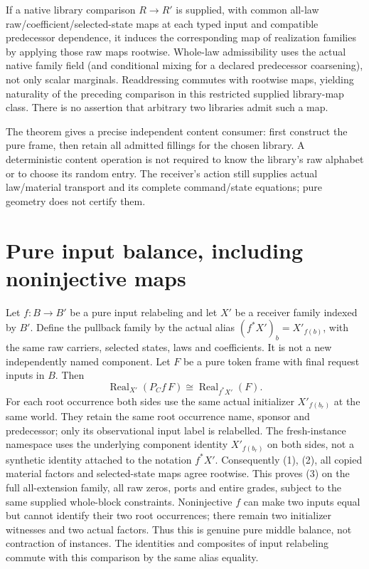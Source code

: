 \documentclass[11pt]{article}
\begin{document}
If a native library comparison $R\to R'$ is supplied, with common all-law raw/coefficient/selected-state maps at each typed input and compatible predecessor dependence, it induces the corresponding map of realization families by applying those raw maps rootwise. Whole-law admissibility uses the actual native family field (and conditional mixing for a declared predecessor coarsening), not only scalar marginals. Readdressing commutes with rootwise maps, yielding naturality of the preceding comparison in this restricted supplied library-map class. There is no assertion that arbitrary two libraries admit such a map.

The theorem gives a precise independent content consumer: first construct the pure frame, then retain all admitted fillings for the chosen library. A deterministic content operation is not required to know the library's raw alphabet or to choose its random entry. The receiver's action still supplies actual law/material transport and its complete command/state equations; pure geometry does not certify them.


\section{Pure input balance, including noninjective maps}
Let $f:B\to B'$ be a pure input relabeling and let $X'$ be a receiver family indexed by $B'$. Define the pullback family by the actual alias $(f^*X')_b=X'_{f(b)}$, with the same raw carriers, selected states, laws and coefficients. It is not a new independently named component. Let $F$ be a pure token frame with final request inputs in $B$. Then
\[
 \operatorname{Real}_{X'}(P_Cf\,F)
       \cong \operatorname{Real}_{f^*X'}(F).             \tag{3}
\]
For each root occurrence both sides use the same actual initializer $X'_{f(b_r)}$ at the same world. They retain the same root occurrence name, sponsor and predecessor; only its observational input label is relabelled. The fresh-instance namespace uses the underlying component identity $X'_{f(b_r)}$ on both sides, not a synthetic identity attached to the notation $f^*X'$. Consequently (1), (2), all copied material factors and selected-state maps agree rootwise. This proves (3) on the full all-extension family, all raw zeros, ports and entire grades, subject to the same supplied whole-block constraints. Noninjective $f$ can make two inputs equal but cannot identify their two root occurrences; there remain two initializer witnesses and two actual factors. Thus this is genuine pure middle balance, not contraction of instances. The identities and composites of input relabeling commute with this comparison by the same alias equality.
\end{document}
